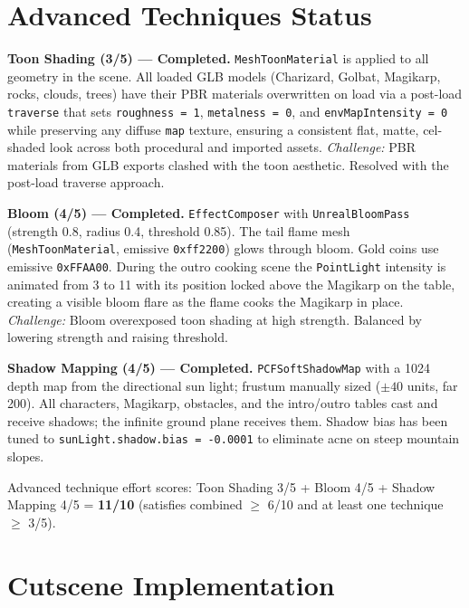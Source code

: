 \documentclass[11pt,a4paper]{article}
\begin{document}
\section{Advanced Techniques Status}

\textbf{Toon Shading (3/5) --- Completed.}
\texttt{MeshToonMaterial} is applied to all geometry in the scene. All loaded
GLB models (Charizard, Golbat, Magikarp, rocks, clouds, trees) have their
PBR materials overwritten on load via a post-load \texttt{traverse} that sets
\texttt{roughness = 1}, \texttt{metalness = 0}, and
\texttt{envMapIntensity = 0} while preserving any diffuse \texttt{map} texture,
ensuring a consistent flat, matte, cel-shaded look across both procedural and
imported assets.
\textit{Challenge:} PBR materials from GLB exports clashed with the toon
aesthetic. Resolved with the post-load traverse approach.

\medskip
\textbf{Bloom (4/5) --- Completed.}
\texttt{EffectComposer} with \texttt{UnrealBloomPass} (strength 0.8, radius 0.4,
threshold 0.85). The tail flame mesh (\texttt{MeshToonMaterial}, emissive
\texttt{0xff2200}) glows through bloom. Gold coins use emissive
\texttt{0xFFAA00}. During the outro cooking scene the \texttt{PointLight}
intensity is animated from 3 to 11 with its position locked above the Magikarp
on the table, creating a visible bloom flare as the flame cooks the Magikarp in
place.
\textit{Challenge:} Bloom overexposed toon shading at high strength. Balanced
by lowering strength and raising threshold.

\medskip
\textbf{Shadow Mapping (4/5) --- Completed.}
\texttt{PCFSoftShadowMap} with a 1024 depth map from the directional
sun light; frustum manually sized (\(\pm40\) units, far 200). All characters,
Magikarp, obstacles, and the intro/outro tables cast and receive shadows; the
infinite ground plane receives them. Shadow bias has been tuned to
\texttt{sunLight.shadow.bias = -0.0001} to eliminate acne on steep mountain
slopes.

\medskip
\noindent Advanced technique effort scores: Toon Shading 3/5 + Bloom 4/5 +
Shadow Mapping 4/5 = \textbf{11/10} \checkmark
\quad(satisfies combined $\geq$ 6/10 and at least one technique $\geq$ 3/5).

\section{Cutscene Implementation}
\end{document}
